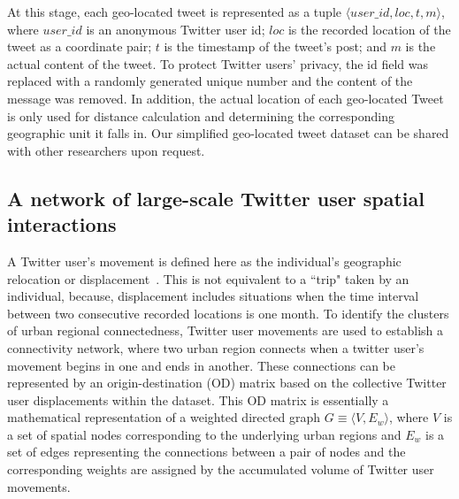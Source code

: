 \documentclass[]{tGIS2e}
\begin{document}
At this stage, each geo-located tweet is represented as a tuple $\langle user\_id, loc, t, m \rangle$, where $user\_id$ is an anonymous Twitter user id; $loc$ is the recorded location of the tweet as a coordinate pair; $t$ is the timestamp of the tweet's post; and $m$ is the actual content of the tweet. 
To protect Twitter users’ privacy, the id field was replaced with a randomly generated unique number and the content of the message was removed.
In addition, the actual location of each geo-located Tweet is only used for distance calculation and determining the corresponding geographic unit it falls in. 
Our simplified geo-located tweet dataset can be shared with other researchers upon request.

\subsection{A network of large-scale Twitter user spatial interactions}
A Twitter user's movement is defined here as the individual's geographic relocation or displacement~\citep{gonzalez2008}.
This is not equivalent to a ``trip" taken by an individual, because, displacement includes situations when the time interval between two consecutive recorded locations is one month.
To identify the clusters of urban regional connectedness, Twitter user movements are used to establish a connectivity network, where two urban region connects when a twitter user's movement begins in one and ends in another.
These connections can be represented by an origin-destination (OD) matrix based on the collective Twitter user displacements within the dataset.
This OD matrix is essentially a mathematical representation of a weighted directed graph $G\equiv\langle V, E_{w}\rangle$, where $V$ is a set of spatial nodes corresponding to the underlying urban regions and $E_{w}$ is a set of edges representing the connections between a pair of nodes and the corresponding weights are assigned by the accumulated volume of Twitter user movements.
\end{document}
